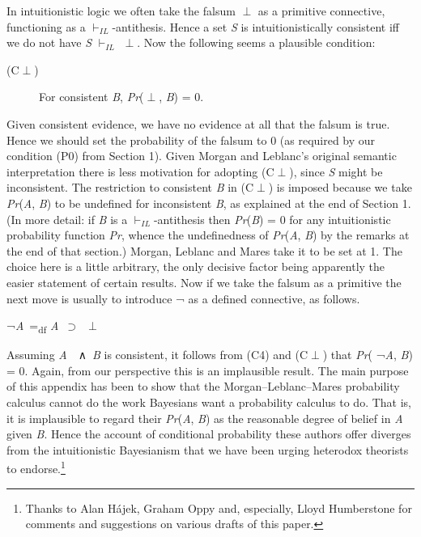 \documentclass[
  10pt,
  letterpaper,
  DIV=11,
  numbers=noendperiod,
  twoside]{scrartcl}
\begin{document}
In intuitionistic logic we often take the falsum \({\perp}\) as a
primitive connective, functioning as a \(\vdash_{IL}\)-antithesis. Hence
a set \emph{S} is intuitionistically consistent iff we do not have
\emph{S} \(\vdash_{IL}\) \({\perp}\). Now the following seems a
plausible condition:

\begin{description}
\item[(C\({\perp}\))]
For consistent \emph{B}, \emph{Pr}(\({\perp}\), \emph{B}) = 0.
\end{description}

Given consistent evidence, we have no evidence at all that the falsum is
true. Hence we should set the probability of the falsum to 0 (as
required by our condition (P0) from Section 1). Given Morgan and
Leblanc's original semantic interpretation there is less motivation for
adopting (C\({\perp}\)), since \emph{S} might be inconsistent. The
restriction to consistent \emph{B} in (C\({\perp}\)) is imposed because
we take \emph{Pr}(\emph{A}, \emph{B}) to be undefined for inconsistent
\emph{B}, as explained at the end of Section 1. (In more detail: if
\emph{B} is a \(\vdash_{IL}\)-antithesis then \emph{Pr}(\emph{B}) = 0
for any intuitionistic probability function \emph{Pr}, whence the
undefinedness of \emph{Pr}(\emph{A}, \emph{B}) by the remarks at the end
of that section.) Morgan, Leblanc and Mares take it to be set at 1. The
choice here is a little arbitrary, the only decisive factor being
apparently the easier statement of certain results. Now if we take the
falsum as a primitive the next move is usually to introduce ¬ as a
defined connective, as follows.

¬\emph{A}~=\textsubscript{df} \emph{A}~\({\supset}\)~\({\perp}\)

Assuming \emph{A}~~∧~\emph{B} is consistent, it follows from (C4) and
(C\({\perp}\)) that \emph{Pr}( ¬\emph{A}, \emph{B}) = 0. Again, from our
perspective this is an implausible result. The main purpose of this
appendix has been to show that the Morgan--Leblanc--Mares probability
calculus cannot do the work Bayesians want a probability calculus to do.
That is, it is implausible to regard their \emph{Pr}(\emph{A}, \emph{B})
as the reasonable degree of belief in \emph{A} given \emph{B}. Hence the
account of conditional probability these authors offer diverges from the
intuitionistic Bayesianism that we have been urging heterodox theorists
to endorse.\footnote{Thanks to Alan Hájek, Graham Oppy and, especially,
  Lloyd Humberstone for comments and suggestions on various drafts of
  this paper.}
\end{document}

